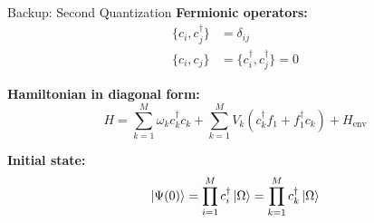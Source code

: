 \documentclass[aspectratio=169,11pt]{beamer}
\begin{document}
\begin{frame}{Backup: Second Quantization}
    \textbf{Fermionic operators:}
    \begin{align*}
        \{c_i, c_j^\dagger\} &= \delta_{ij} \\
        \{c_i, c_j\} &= \{c_i^\dagger, c_j^\dagger\} = 0
    \end{align*}
    
    \textbf{Hamiltonian in diagonal form:}
    \begin{equation*}
        H = \sum_{k=1}^M \omega_k c_k^\dagger c_k + \sum_{k=1}^M V_k(c_k^\dagger f_1 + f_1^\dagger c_k) + H_{\mathrm{env}}
    \end{equation*}
    
    \textbf{Initial state:}
    \begin{equation*}
        \ket{\Psi(0)} = \prod_{i=1}^M c_i^\dagger \ket{\Omega} = \prod_{k=1}^M c_k^\dagger \ket{\Omega}
    \end{equation*}
\end{frame}
\end{document}
